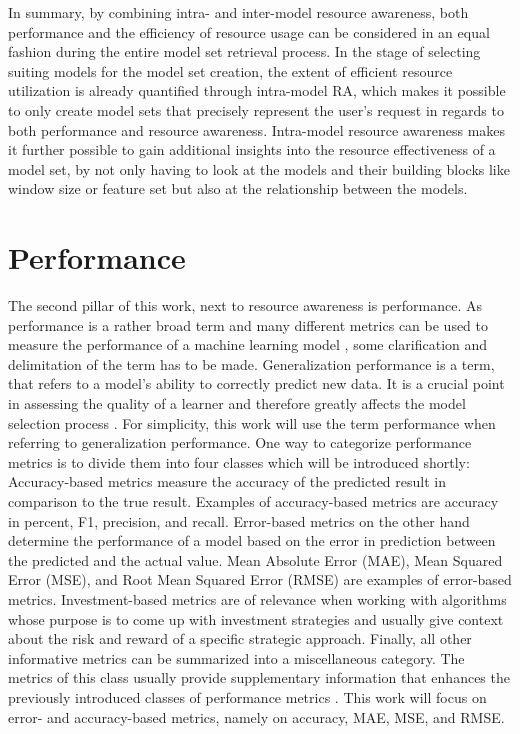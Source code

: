 In summary, by combining intra- and inter-model resource awareness, both performance and the efficiency of resource usage can be considered in an equal fashion during the entire model set retrieval process. In the stage of selecting suiting models for the model set creation, the extent of efficient resource utilization is already quantified through intra-model RA, which makes it possible to only create model sets that precisely represent the user's request in regards to both performance and resource awareness. Intra-model resource awareness makes it further possible to gain additional insights into the resource effectiveness of a model set, by not only having to look at the models and their building blocks like window size or feature set but also at the relationship between the models.



\section{Performance} \label{performance}

The second pillar of this work, next to resource awareness is performance. As performance is a rather broad term and many different metrics can be used to measure the performance of a machine learning model \cite{erickson2021}, some clarification and delimitation of the term has to be made. Generalization performance is a term, that refers to a model’s ability to correctly predict new data. It is a crucial point in assessing the quality of a learner and therefore greatly affects the model selection process \cite{hastie2009}. For simplicity, this work will use the term performance when referring to generalization performance. One way to categorize performance metrics is to divide them into four classes which will be introduced shortly: Accuracy-based metrics measure the accuracy of the predicted result in comparison to the true result. Examples of accuracy-based metrics are accuracy in percent, F1, precision, and recall. Error-based metrics on the other hand determine the performance of a model based on the error in prediction between the predicted and the actual value. Mean Absolute Error (MAE), Mean Squared Error (MSE), and Root Mean Squared Error (RMSE) are examples of error-based metrics. Investment-based metrics are of relevance when working with algorithms whose purpose is to come up with investment strategies and usually give context about the risk and reward of a specific strategic approach. Finally, all other informative metrics can be summarized into a miscellaneous category. The metrics of this class usually provide supplementary information that enhances the previously introduced classes of performance metrics \cite{dessain2022}. This work will focus on error- and accuracy-based metrics, namely on accuracy, MAE, MSE, and RMSE.

